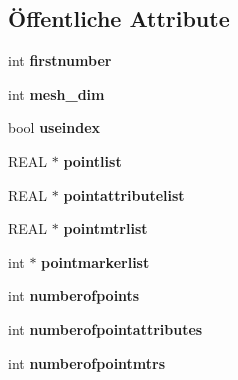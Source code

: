\subsection*{Öffentliche Attribute}
\begin{DoxyCompactItemize}
\item 
\hypertarget{classtetgenio_ace3ae3f90741f8e51e02f5007d81e440}{int {\bfseries firstnumber}}\label{classtetgenio_ace3ae3f90741f8e51e02f5007d81e440}

\item 
\hypertarget{classtetgenio_a79a469ad1e88f5830d2fcefe9a8ca53f}{int {\bfseries mesh\-\_\-dim}}\label{classtetgenio_a79a469ad1e88f5830d2fcefe9a8ca53f}

\item 
\hypertarget{classtetgenio_a0abccb9dbf365d613dd581b1c0633c8e}{bool {\bfseries useindex}}\label{classtetgenio_a0abccb9dbf365d613dd581b1c0633c8e}

\item 
\hypertarget{classtetgenio_a69b1e0f645f57281d838569c2bbc5789}{R\-E\-A\-L $\ast$ {\bfseries pointlist}}\label{classtetgenio_a69b1e0f645f57281d838569c2bbc5789}

\item 
\hypertarget{classtetgenio_a4273b235ec6260723bae849c3184ae6f}{R\-E\-A\-L $\ast$ {\bfseries pointattributelist}}\label{classtetgenio_a4273b235ec6260723bae849c3184ae6f}

\item 
\hypertarget{classtetgenio_adc248b0a839167ad5389711798613114}{R\-E\-A\-L $\ast$ {\bfseries pointmtrlist}}\label{classtetgenio_adc248b0a839167ad5389711798613114}

\item 
\hypertarget{classtetgenio_afc154d429cb5344b1ea12318b094a2c8}{int $\ast$ {\bfseries pointmarkerlist}}\label{classtetgenio_afc154d429cb5344b1ea12318b094a2c8}

\item 
\hypertarget{classtetgenio_a5211bec795ba870c01fadade4cd8670f}{int {\bfseries numberofpoints}}\label{classtetgenio_a5211bec795ba870c01fadade4cd8670f}

\item 
\hypertarget{classtetgenio_a3d263e577de1fa81296abe9a6ba029b0}{int {\bfseries numberofpointattributes}}\label{classtetgenio_a3d263e577de1fa81296abe9a6ba029b0}

\item 
\hypertarget{classtetgenio_a1a62cf8c03758eb3e1920c6c506c1a64}{int {\bfseries numberofpointmtrs}}\label{classtetgenio_a1a62cf8c03758eb3e1920c6c506c1a64}


\end{DoxyCompactItemize}

